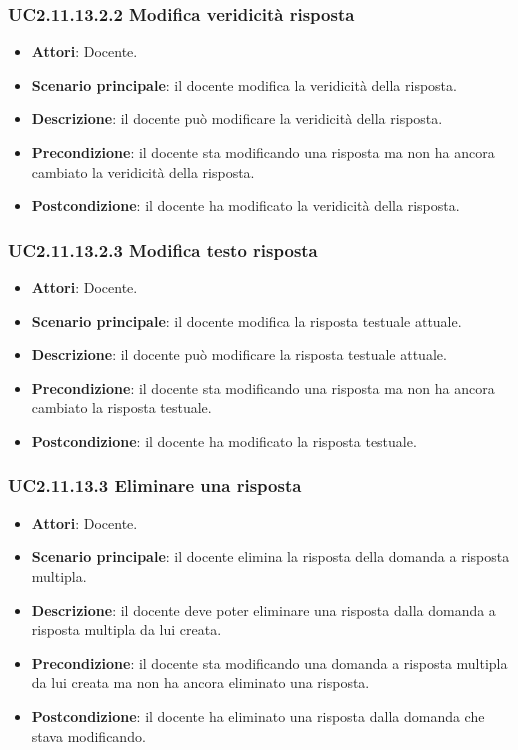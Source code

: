 \subsubsection{UC2.11.13.2.2 Modifica veridicità risposta}
\begin{itemize}
\item \textbf{Attori}: Docente.
\item \textbf{Scenario principale}: il docente modifica la veridicità della risposta.
\item \textbf{Descrizione}: il docente può modificare la veridicità della risposta.
\item \textbf{Precondizione}: il docente sta modificando una risposta ma non ha ancora cambiato la veridicità della risposta.
\item \textbf{Postcondizione}: il docente ha modificato la veridicità della risposta.
\end{itemize}
\subsubsection{UC2.11.13.2.3 Modifica testo risposta}
\begin{itemize}
\item \textbf{Attori}: Docente.
\item \textbf{Scenario principale}: il docente modifica la risposta testuale attuale.
\item \textbf{Descrizione}: il docente può modificare la risposta testuale attuale.
\item \textbf{Precondizione}: il docente sta modificando una risposta ma non ha ancora cambiato la risposta testuale.
\item \textbf{Postcondizione}: il docente ha modificato la risposta testuale.
\end{itemize}
\subsubsection{UC2.11.13.3 Eliminare una risposta}
\begin{itemize}
\item \textbf{Attori}: Docente.
\item \textbf{Scenario principale}: il docente elimina la risposta della domanda a risposta multipla.
\item \textbf{Descrizione}: il docente deve poter eliminare una risposta dalla domanda a risposta multipla da lui creata.
\item \textbf{Precondizione}: il docente sta modificando una domanda a risposta multipla da lui creata ma non ha ancora eliminato una risposta.
\item \textbf{Postcondizione}: il docente ha eliminato una risposta dalla domanda che stava modificando.
\end{itemize}
